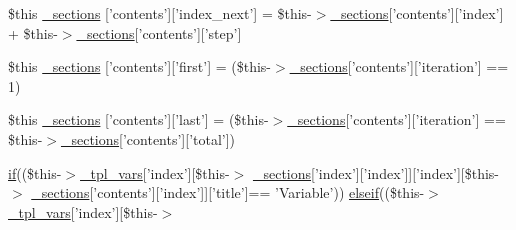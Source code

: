 \begin{DoxyCompactItemize}
\item 
\$this \hyperlink{34d6fa4bfd5eef6424a9ddc74a166350_2_06_06-19_05_06_06-1910644431_05basicindex_8tpl_8php_ac545c8e745c0c0b1995bd3ee2f78278f}{\-\_\-sections} \mbox{[}'contents'\mbox{]}\mbox{[}'index\-\_\-next'\mbox{]} = \$this-\/$>$\hyperlink{_06_06127_05_06_0612781687_05pkgelementindex_8tpl_8php_a9e3d26b39edfe29c3f29b8035ef33828}{\-\_\-sections}\mbox{[}'contents'\mbox{]}\mbox{[}'index'\mbox{]} + \$this-\/$>$\hyperlink{_06_06127_05_06_0612781687_05pkgelementindex_8tpl_8php_a9e3d26b39edfe29c3f29b8035ef33828}{\-\_\-sections}\mbox{[}'contents'\mbox{]}\mbox{[}'step'\mbox{]}
\item 
\$this \hyperlink{34d6fa4bfd5eef6424a9ddc74a166350_2_06_06-19_05_06_06-1910644431_05basicindex_8tpl_8php_a53541e3ce33ac24750574a8a0fe10f8d}{\-\_\-sections} \mbox{[}'contents'\mbox{]}\mbox{[}'first'\mbox{]} = (\$this-\/$>$\hyperlink{_06_06127_05_06_0612781687_05pkgelementindex_8tpl_8php_a9e3d26b39edfe29c3f29b8035ef33828}{\-\_\-sections}\mbox{[}'contents'\mbox{]}\mbox{[}'iteration'\mbox{]} == 1)
\item 
\$this \hyperlink{34d6fa4bfd5eef6424a9ddc74a166350_2_06_06-19_05_06_06-1910644431_05basicindex_8tpl_8php_a69e9b5c157296fb14160c4ef27275f65}{\-\_\-sections} \mbox{[}'contents'\mbox{]}\mbox{[}'last'\mbox{]} = (\$this-\/$>$\hyperlink{_06_06127_05_06_0612781687_05pkgelementindex_8tpl_8php_a9e3d26b39edfe29c3f29b8035ef33828}{\-\_\-sections}\mbox{[}'contents'\mbox{]}\mbox{[}'iteration'\mbox{]} == \$this-\/$>$\hyperlink{_06_06127_05_06_0612781687_05pkgelementindex_8tpl_8php_a9e3d26b39edfe29c3f29b8035ef33828}{\-\_\-sections}\mbox{[}'contents'\mbox{]}\mbox{[}'total'\mbox{]})
\item 
\hyperlink{_setup_8inc_8php_ad0184337b31d13763ec8751feff4aabe}{if}((\$this-\/$>$\hyperlink{_06_06127_05_06_0612781687_05pkgelementindex_8tpl_8php_a4a4846d8e68d455590131a05697f67a3}{\-\_\-tpl\-\_\-vars}\mbox{[}'index'\mbox{]}\mbox{[}\$this-\/$>$\*
\hyperlink{_06_06127_05_06_0612781687_05pkgelementindex_8tpl_8php_a9e3d26b39edfe29c3f29b8035ef33828}{\-\_\-sections}\mbox{[}'index'\mbox{]}\mbox{[}'index'\mbox{]}\mbox{]}\mbox{[}'index'\mbox{]}\mbox{[}\$this-\/$>$\*
\hyperlink{_06_06127_05_06_0612781687_05pkgelementindex_8tpl_8php_a9e3d26b39edfe29c3f29b8035ef33828}{\-\_\-sections}\mbox{[}'contents'\mbox{]}\mbox{[}'index'\mbox{]}\mbox{]}\mbox{[}'title'\mbox{]}== \*
'\-Variable')) \hyperlink{php_thumb_8demo_8check_8php_af92779326267616cd7c3cdaaa9484bc9}{elseif}((\$this-\/$>$\*
\hyperlink{_06_06127_05_06_0612781687_05pkgelementindex_8tpl_8php_a4a4846d8e68d455590131a05697f67a3}{\-\_\-tpl\-\_\-vars}\mbox{[}'index'\mbox{]}\mbox{[}\$this-\/$>$\*

\end{DoxyCompactItemize}
